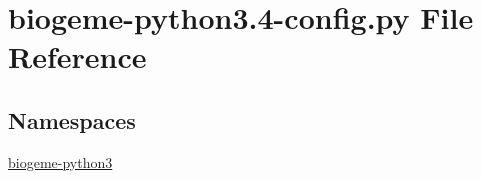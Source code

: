 \hypertarget{biogeme-python3_84-config_8py}{\section{biogeme-\/python3.4-\/config.py File Reference}
\label{biogeme-python3_84-config_8py}
}
\subsection*{Namespaces}
\begin{DoxyCompactItemize}
\item 
 \hyperlink{namespacebiogeme-python3}{biogeme-\/python3}
\end{DoxyCompactItemize}
